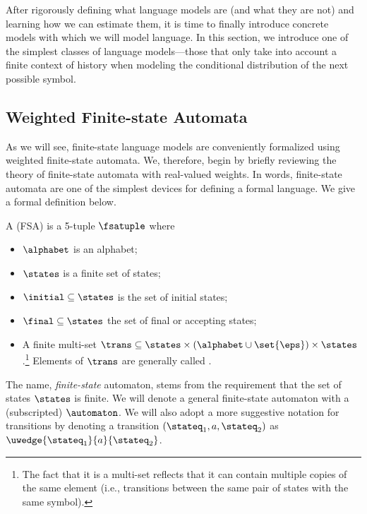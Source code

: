 After rigorously defining what language models are (and what they are not) and learning how we can estimate them, it is time to finally introduce concrete models with which we will model language.
In this section, we introduce one of the simplest classes of language models---those that only take into account a finite context of history when modeling the conditional distribution of the next possible symbol.

\subsection{Weighted Finite-state Automata}

As we will see, finite-state language models are conveniently formalized using weighted finite-state automata.
We, therefore, begin by briefly reviewing the theory of finite-state automata with real-valued weights. 
In words, finite-state automata are one of the simplest devices for defining a formal language. 
We give a formal definition below.
\begin{definition}
A  (FSA) is a 5-tuple $\fsatuple$ where 
\begin{itemize}
    \item $\alphabet$ is an alphabet;
    \item $\states$ is a finite set of states;
    \item $\initial \subseteq \states$ is the set of initial states; 
    \item $\final \subseteq \states$ the set of final or accepting states;
    \item A finite multi-set $\trans \subseteq \states \times \left( \alphabet \cup  \set{\eps} \right) \times \states$.\footnote{The fact that it is a multi-set reflects that it can contain multiple copies of the same element (i.e., transitions between the same pair of states with the same symbol).}
    Elements of $\trans$ are generally called . 
\end{itemize}
\end{definition}

The name, \emph{finite-state} automaton, stems from the requirement that the set of states $\states$ is finite.
We will denote a general finite-state automaton with a (subscripted) $\automaton$. 
We will also adopt a more suggestive notation for transitions by denoting a transition $\left(\stateq_1, a, \stateq_2 \right)$ as $\uwedge{\stateq_1}{a}{\stateq_2}$. 

